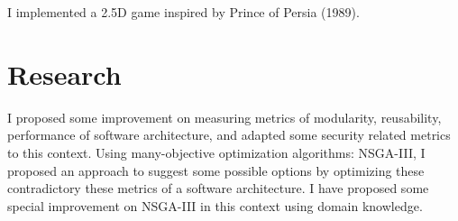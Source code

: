 \documentclass[]{al-jamil-suvo-resume-openfont}
\begin{document}
\begin{minipage}[t]{0.66\textwidth}
I implemented a 2.5D game inspired by Prince of Persia (1989). 
\sectionsep

\section{Research}
I proposed some improvement on measuring metrics of modularity, reusability, performance of software architecture, and adapted some security related metrics  to this context. Using many-objective optimization algorithms: NSGA-III, I proposed an approach to suggest some possible options by optimizing these contradictory these metrics of a software architecture. I have proposed some special  improvement on NSGA-III in this context  using domain knowledge.  



\end{minipage} 
\end{document}
